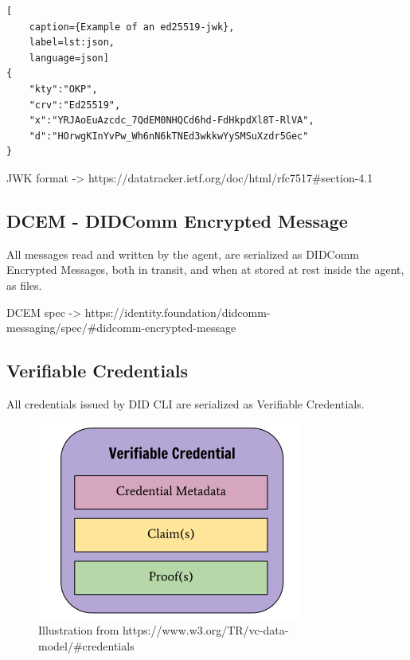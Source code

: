 \newpage

\begin{lstlisting}[
    caption={Example of an ed25519-jwk},
    label=lst:json,
    language=json]
{
	"kty":"OKP",
	"crv":"Ed25519",
	"x":"YRJAoEuAzcdc_7QdEM0NHQCd6hd-FdHkpdXl8T-RlVA",
	"d":"HOrwgKInYvPw_Wh6nN6kTNEd3wkkwYySMSuXzdr5Gec"
}
\end{lstlisting}

JWK format -> https://datatracker.ietf.org/doc/html/rfc7517\#section-4.1



\subsection{DCEM - DIDComm Encrypted Message}

All messages read and written by the agent, are serialized as DIDComm Encrypted Messages, both in transit, and when at stored at rest inside the agent, as files.

DCEM spec -> https://identity.foundation/didcomm-messaging/spec/\#didcomm-encrypted-message



\subsection{Verifiable Credentials}

All credentials issued by DID CLI are serialized as Verifiable Credentials.

    \begin{figure}[htbp]
      \centering
      \includegraphics[width=.7\textwidth]{figures/credential.png}
      \caption[]{Illustration from https://www.w3.org/TR/vc-data-model/\#credentials}
    \end{figure}



